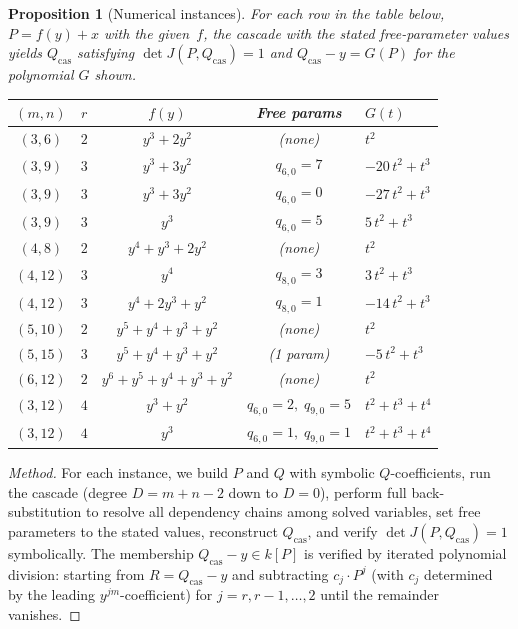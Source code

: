 \documentclass[12pt,a4paper]{article}
\newtheorem{proposition}[theorem]{Proposition}
\theoremstyle{definition}
\newcommand{\kk}{k}
\begin{document}
\begin{proposition}[Numerical instances]\label{prop:numerical-instances}
For each row in the table below, $P = f(y) + x$ with the given~$f$,
the cascade with the stated free-parameter values yields
$Q_{\mathrm{cas}}$ satisfying $\det J(P, Q_{\mathrm{cas}}) = 1$
and $Q_{\mathrm{cas}} - y = G(P)$ for the polynomial $G$ shown.

\medskip
\begin{center}
\renewcommand{\arraystretch}{1.2}
\begin{tabular}{ccccl}
\hline
$(m,n)$ & $r$ & $f(y)$ & Free params & $G(t)$ \\
\hline
$(3,6)$ & $2$ & $y^3 + 2y^2$ & (none) & $t^2$ \\
$(3,9)$ & $3$ & $y^3 + 3y^2$ & $q_{6,0} = 7$ & $-20\,t^2 + t^3$ \\
$(3,9)$ & $3$ & $y^3 + 3y^2$ & $q_{6,0} = 0$ & $-27\,t^2 + t^3$ \\
$(3,9)$ & $3$ & $y^3$ & $q_{6,0} = 5$ & $5\,t^2 + t^3$ \\
$(4,8)$ & $2$ & $y^4 + y^3 + 2y^2$ & (none) & $t^2$ \\
$(4,12)$ & $3$ & $y^4$ & $q_{8,0} = 3$ & $3\,t^2 + t^3$ \\
$(4,12)$ & $3$ & $y^4 + 2y^3 + y^2$ & $q_{8,0} = 1$ & $-14\,t^2 + t^3$ \\
$(5,10)$ & $2$ & $y^5 + y^4 + y^3 + y^2$ & (none) & $t^2$ \\
$(5,15)$ & $3$ & $y^5 + y^4 + y^3 + y^2$ & (1 param) & $-5\,t^2 + t^3$ \\
$(6,12)$ & $2$ & $y^6 + y^5 + y^4 + y^3 + y^2$ & (none) & $t^2$ \\
$(3,12)$ & $4$ & $y^3 + y^2$ & $q_{6,0} = 2,\; q_{9,0} = 5$ & $t^2 + t^3 + t^4$ \\
$(3,12)$ & $4$ & $y^3$ & $q_{6,0} = 1,\; q_{9,0} = 1$ & $t^2 + t^3 + t^4$ \\
\hline
\end{tabular}
\end{center}
\end{proposition}

\begin{proof}[Method]
For each instance, we build $P$ and $Q$ with symbolic $Q$-coefficients,
run the cascade (degree $D = m+n-2$ down to $D = 0$), perform full
back-substitution to resolve all dependency chains among solved variables,
set free parameters to the stated values, reconstruct $Q_{\mathrm{cas}}$,
and verify $\det J(P, Q_{\mathrm{cas}}) = 1$ symbolically.
The membership $Q_{\mathrm{cas}} - y \in \kk[P]$ is verified by
iterated polynomial division: starting from $R = Q_{\mathrm{cas}} - y$
and subtracting $c_j \cdot P^j$ (with $c_j$ determined by the leading
$y^{jm}$-coefficient) for $j = r, r-1, \ldots, 2$ until the remainder
vanishes.
\end{proof}
\end{document}
